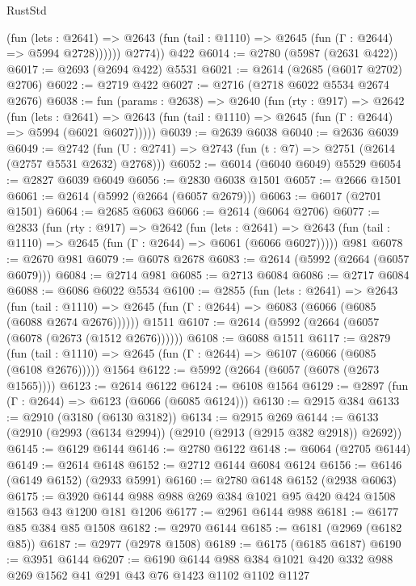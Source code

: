 \begin{lexlean}{RustStd}
\begin{coremodule}
              (fun (lets : @2641) =>
              @2643 (fun (tail : @1110) => @2645 (fun (Γ : @2644) => @5994 @2728))))))
        @2774))
    @422
@6014 := @2780 (@5987 (@2631 @422))
@6017 := @2693 (@2694 @422) @5531
@6021 := @2614 (@2685 (@6017 @2702) @2706)
@6022 := @2719 @422
@6027 := @2716 (@2718 @6022 @5534 @2674 @2676)
@6038 := fun (params : @2638) =>
  @2640
    (fun (rty : @917) =>
    @2642
      (fun (lets : @2641) =>
      @2643 (fun (tail : @1110) => @2645 (fun (Γ : @2644) => @5994 (@6021 @6027)))))
@6039 := @2639 @6038
@6040 := @2636 @6039
@6049 := @2742 (fun (U : @2741) => @2743 (fun (t : @7) => @2751 (@2614 (@2757 @5531 @2632) @2768)))
@6052 := @6014 (@6040 @6049) @5529
@6054 := @2827 @6039 @6049
@6056 := @2830 @6038 @1501
@6057 := @2666 @1501
@6061 := @2614 (@5992 (@2664 (@6057 @2679)))
@6063 := @6017 (@2701 @1501)
@6064 := @2685 @6063
@6066 := @2614 (@6064 @2706)
@6077 := @2833
    (fun (rty : @917) =>
    @2642
      (fun (lets : @2641) =>
      @2643 (fun (tail : @1110) => @2645 (fun (Γ : @2644) => @6061 (@6066 @6027)))))
    @981
@6078 := @2670 @981
@6079 := @6078 @2678
@6083 := @2614 (@5992 (@2664 (@6057 @6079)))
@6084 := @2714 @981
@6085 := @2713 @6084
@6086 := @2717 @6084
@6088 := @6086 @6022 @5534
@6100 := @2855
    (fun (lets : @2641) =>
    @2643
      (fun (tail : @1110) => @2645 (fun (Γ : @2644) => @6083 (@6066 (@6085 (@6088 @2674 @2676))))))
    @1511
@6107 := @2614 (@5992 (@2664 (@6057 (@6078 (@2673 (@1512 @2676))))))
@6108 := @6088 @1511
@6117 := @2879
    (fun (tail : @1110) => @2645 (fun (Γ : @2644) => @6107 (@6066 (@6085 (@6108 @2676)))))
    @1564
@6122 := @5992 (@2664 (@6057 (@6078 (@2673 @1565))))
@6123 := @2614 @6122
@6124 := @6108 @1564
@6129 := @2897 (fun (Γ : @2644) => @6123 (@6066 (@6085 @6124)))
@6130 := @2915 @384
@6133 := @2910 (@3180 (@6130 @3182))
@6134 := @2915 @269
@6144 := @6133 (@2910 (@2993 (@6134 @2994)) (@2910 (@2913 (@2915 @382 @2918)) @2692))
@6145 := @6129 @6144
@6146 := @2780 @6122
@6148 := @6064 (@2705 @6144)
@6149 := @2614 @6148
@6152 := @2712 @6144 @6084 @6124
@6156 := @6146 (@6149 @6152) (@2933 @5991)
@6160 := @2780 @6148 @6152 (@2938 @6063)
@6175 := @3920 @6144 @988 @988 @269 @384 @1021 @95 @420 @424 @1508 @1563 @43 @1200 @181 @1206
@6177 := @2961 @6144 @988
@6181 := @6177 @85 @384 @85 @1508
@6182 := @2970 @6144
@6185 := @6181 (@2969 (@6182 @85))
@6187 := @2977 (@2978 @1508)
@6189 := @6175 (@6185 @6187)
@6190 := @3951 @6144
@6207 := @6190
    @6144
    @988
    @384
    @1021
    @420
    @332
    @988
    @269
    @1562
    @41
    @291
    @43
    @76
    @1423
    @1102
    @1102
    @1127

\end{coremodule}
\end{lexlean}
